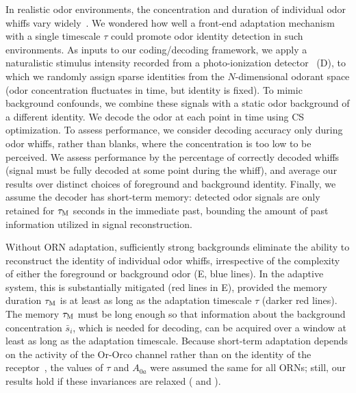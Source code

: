 \documentclass[9pt,lineno]{elife}
\begin{document}
In realistic odor environments, the concentration and duration of individual odor whiffs vary widely~\citep{celani}. We wondered how well a front-end adaptation mechanism with a single timescale $\tau$ could promote odor identity detection in such environments. As inputs to our coding/decoding framework, we apply a naturalistic stimulus intensity recorded from a photo-ionization detector~\citep{srinivas_elife} (D), to which we randomly assign sparse identities from the $N$-dimensional odorant space (odor concentration fluctuates in time, but identity is fixed). To mimic background confounds, we combine these signals with a static odor background of a different identity. We decode the odor at each point in time using CS optimization. To assess performance, we consider decoding accuracy only during odor whiffs, rather than blanks, where the concentration is too low to be perceived. We assess performance by the percentage of correctly decoded whiffs (signal must be fully decoded at some point during the whiff), and average our results over distinct choices of foreground and background identity. Finally, we assume the decoder has short-term memory: detected odor signals are only retained for $\tau_{\textup {M}}$ seconds in the immediate past, bounding the amount of past information utilized in signal reconstruction. 

Without ORN adaptation, sufficiently strong backgrounds eliminate the ability to reconstruct the identity of individual odor whiffs, irrespective of the complexity of either the foreground or background odor (E, blue lines). In the adaptive system, this is substantially mitigated (red lines in E), provided the memory duration $\tau_{\textup {M}}$ is at least as long as the adaptation timescale $\tau$ (darker red lines). The memory $\tau_{\textup {M}}$ must be long enough so that information about the background concentration $\bar {s}_i$, which is needed for decoding, can be acquired over a window at least as long as the adaptation timescale. Because short-term adaptation depends on the activity of the Or-Orco channel rather than on the identity of the receptor~\citep{nagel_wilson_biophysical,martelli,srinivas_elife}, the values of $\tau$ and $A_{0a}$ were assumed the same for all ORNs; still, our results hold if these invariances are relaxed ( and ). 
\end{document}

